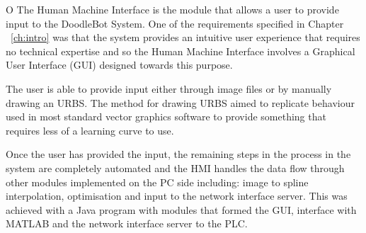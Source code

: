 O %
The Human Machine Interface is the module that allows a user to provide input to the DoodleBot System. One of the requirements specified in Chapter ~\ref{ch:intro} was that the system provides an intuitive user experience that requires no technical expertise and so the Human Machine Interface involves a Graphical User Interface (GUI) designed towards this purpose.

The user is able to provide input either through image files or by manually drawing an URBS. The method for drawing URBS aimed to replicate behaviour used in most standard vector graphics software to provide something that requires less of a learning curve to use.

Once the user has provided the input, the remaining steps in the process in the system are completely automated and the HMI handles the data flow through other modules implemented on the PC side including: image to spline interpolation, optimisation and input to the network interface server. This was achieved with a Java program with modules that formed the GUI, interface with MATLAB\textsuperscript{\textregistered} and the network interface server to the PLC.